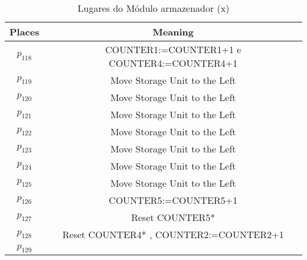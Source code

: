 \begin{table}[htbp]
\caption{Lugares do Módulo armazenador (x)}
\centering
\begin{tabular}{c|c}
Places & Meaning\\
\hline
\hyperlink{partialNet:p118}{\hypertarget{partialTable:p118}{$p_{118}$}} & COUNTER1:=COUNTER1+1 e COUNTER4:=COUNTER4+1\\
\hyperlink{partialNet:p119}{\hypertarget{partialTable:p119}{$p_{119}$}} & Move Storage Unit to the Left\\
\hyperlink{partialNet:p120}{\hypertarget{partialTable:p120}{$p_{120}$}} & Move Storage Unit to the Left\\
\hyperlink{partialNet:p121}{\hypertarget{partialTable:p121}{$p_{121}$}} & Move Storage Unit to the Left\\
\hyperlink{partialNet:p122}{\hypertarget{partialTable:p122}{$p_{122}$}} & Move Storage Unit to the Left\\
\hyperlink{partialNet:p123}{\hypertarget{partialTable:p123}{$p_{123}$}} & Move Storage Unit to the Left\\
\hyperlink{partialNet:p124}{\hypertarget{partialTable:p124}{$p_{124}$}} & Move Storage Unit to the Left\\
\hyperlink{partialNet:p125}{\hypertarget{partialTable:p125}{$p_{125}$}} & Move Storage Unit to the Left\\
\hyperlink{partialNet:p126}{\hypertarget{partialTable:p126}{$p_{126}$}} & COUNTER5:=COUNTER5+1\\
\hyperlink{partialNet:p127}{\hypertarget{partialTable:p127}{$p_{127}$}} & Reset COUNTER5*\\
\hyperlink{partialNet:p128}{\hypertarget{partialTable:p128}{$p_{128}$}} & Reset COUNTER4* , COUNTER2:=COUNTER2+1\\
\hyperlink{partialNet:p129}{\hypertarget{partialTable:p129}{$p_{129}$}} & \\
\end{tabular}
\end{table}

